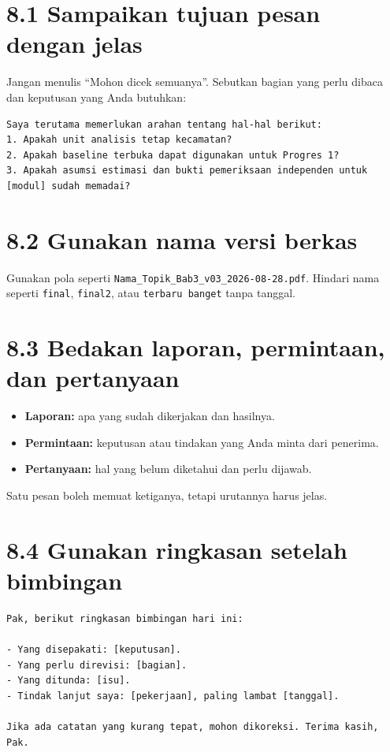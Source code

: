 \documentclass[
  indonesian,
]{article}
\providecommand{\tightlist}{%
  \setlength{\itemsep}{0pt}\setlength{\parskip}{0pt}}
\renewcommand{\subsection}{\section}
\begin{document}
\subsection{8.1 Sampaikan tujuan pesan dengan
jelas}\label{sampaikan-tujuan-pesan-dengan-jelas}

Jangan menulis ``Mohon dicek semuanya''. Sebutkan bagian yang perlu
dibaca dan keputusan yang Anda butuhkan:

\begin{verbatim}
Saya terutama memerlukan arahan tentang hal-hal berikut:
1. Apakah unit analisis tetap kecamatan?
2. Apakah baseline terbuka dapat digunakan untuk Progres 1?
3. Apakah asumsi estimasi dan bukti pemeriksaan independen untuk [modul] sudah memadai?
\end{verbatim}

\subsection{8.2 Gunakan nama versi
berkas}\label{gunakan-nama-versi-berkas}

Gunakan pola seperti \texttt{Nama\_Topik\_Bab3\_v03\_2026-08-28.pdf}.
Hindari nama seperti \texttt{final}, \texttt{final2}, atau
\texttt{terbaru\ banget} tanpa tanggal.

\subsection{8.3 Bedakan laporan, permintaan, dan
pertanyaan}\label{bedakan-laporan-permintaan-dan-pertanyaan}

\begin{itemize}
\tightlist
\item
  \textbf{Laporan:} apa yang sudah dikerjakan dan hasilnya.
\item
  \textbf{Permintaan:} keputusan atau tindakan yang Anda minta dari
  penerima.
\item
  \textbf{Pertanyaan:} hal yang belum diketahui dan perlu dijawab.
\end{itemize}

Satu pesan boleh memuat ketiganya, tetapi urutannya harus jelas.

\subsection{8.4 Gunakan ringkasan setelah
bimbingan}\label{gunakan-ringkasan-setelah-bimbingan}

\begin{verbatim}
Pak, berikut ringkasan bimbingan hari ini:

- Yang disepakati: [keputusan].
- Yang perlu direvisi: [bagian].
- Yang ditunda: [isu].
- Tindak lanjut saya: [pekerjaan], paling lambat [tanggal].

Jika ada catatan yang kurang tepat, mohon dikoreksi. Terima kasih, Pak.
\end{verbatim}
\end{document}
